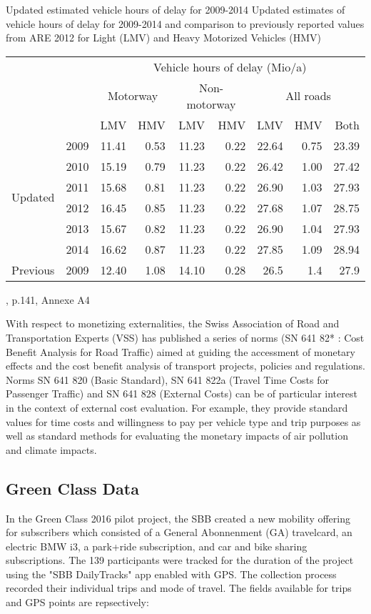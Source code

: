 \createtable%
{Updated estimated vehicle hours of delay for 2009-2014}%
{Updated estimates of vehicle hours of delay for 2009-2014 and comparison to previously reported values from ARE 2012 for Light (LMV) and Heavy Motorized Vehicles (HMV)}%
{\label{tab:vehHoursDelayMkInfras}}%
{%
  \begin{tabular}[c]{lrrrrrrrr}
    \toprule
    \multirow{3}{*}{} & & \multicolumn{7}{c}{Vehicle hours of delay (Mio/a)}\\ 
    & & \multicolumn{2}{c}{Motorway} & \multicolumn{2}{c}{Non-motorway} & \multicolumn{3}{c}{All roads}\\
    & &  LMV & HMV & LMV & HMV & LMV & HMV & Both\\
    \midrule
    \multirow{6}{*}{Updated}
    & 2009 & 11.41 & 0.53 & 11.23 & 0.22 & 22.64 & 0.75 & 23.39 \\
    & 2010 & 15.19 & 0.79 & 11.23 & 0.22 & 26.42 & 1.00 & 27.42 \\
    & 2011 & 15.68 & 0.81 & 11.23 & 0.22 & 26.90 & 1.03 & 27.93 \\
    & 2012 & 16.45 & 0.85 & 11.23 & 0.22 & 27.68 & 1.07 & 28.75 \\
    & 2013 & 15.67 & 0.82 & 11.23 & 0.22 & 26.90 & 1.04 & 27.93 \\
    & 2014 & 16.62 & 0.87 & 11.23 & 0.22 & 27.85 & 1.09 & 28.94 \\
    \midrule
    Previous & 2009 & 12.40 & 1.08 & 14.10 & 0.28 & 26.5 & 1.4 & 27.9 \\
    \bottomrule
  \end{tabular}
}%
{\citet{mkinfras2016staukosten}, p.141, Annexe A4}

With respect to monetizing externalities, the Swiss Association of Road and Transportation Experts (VSS) has published a series of norms (SN 641 82* : Cost Benefit Analysis for Road Traffic) aimed at guiding the accessment of monetary effects and the cost benefit analysis of transport projects, policies and regulations.
Norms SN 641 820 (Basic Standard), SN 641 822a (Travel Time Costs for Passenger Traffic) and SN 641 828 (External Costs) can be of particular interest in the context of external cost evaluation.
For example, they provide standard values for time costs and willingness to pay per vehicle type and trip purposes as well as standard methods for evaluating the monetary impacts of air pollution and climate impacts.
 

\subsection{Green Class Data}
In the Green Class 2016 pilot project, the SBB created a new mobility offering for subscribers which consisted of a General Abonnenment (GA) travelcard, an electric BMW i3, a park+ride subscription, and car and bike sharing subscriptions.
The 139 participants were tracked for the duration of the project using the "SBB DailyTracks" app enabled with GPS.
The collection process recorded their individual trips and mode of travel.  The fields available for trips and GPS points are repsectively:

